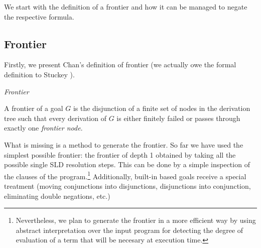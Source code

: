 \documentclass{llncs}
\begin{document}
We start with the definition of a frontier and how it can be managed
to negate the respective formula.


\subsection{Frontier}
\label{frontier}

Firstly, we present Chan's definition of frontier (we actually owe the formal
definition to Stuckey \cite{Stuckey95}).

\begin{definition}{\em Frontier}

A frontier of a goal $G$ is the disjunction of a finite set of nodes
in the derivation tree such that every derivation of $G$ is either
finitely failed or passes through exactly one {\em frontier node}.
\end{definition}

What is missing is a method to generate the frontier. So far we have
used the simplest possible frontier: the frontier of depth 1 obtained
by taking all the possible single SLD resolution steps. This can be
done by a simple inspection of the clauses of the
program.\footnote{Nevertheless, we plan to generate the frontier in a
more efficient way by using abstract interpretation over the input
program for detecting the degree of evaluation of a term that will be
necesary at execution time.} Additionally, built-in based goals
receive a special treatment (moving conjunctions into disjunctions,
disjunctions into conjunction, eliminating double negations, etc.)
\end{document}
